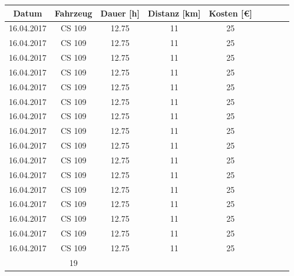 \documentclass[
	pagenumber=false, %
	parskip=half, %
	fromalign=right, %
	foldmarks=true, %
	addrfield=true %
	firstfoot=on %
    ]{scrlttr2}
\begin{document}
\newpage
\begin{tabular}{ | c | c | c | c | c | c | c | c | c | }
\hline
Datum & Fahrzeug & Dauer [h] & Distanz [km]& Kosten [\euro{}]\\ \hline
16.04.2017 & CS 109 & 12.75 & 11 & 25 \\ 
16.04.2017 & CS 109 & 12.75 & 11 & 25 \\ 
16.04.2017 & CS 109 & 12.75 & 11 & 25 \\ 
16.04.2017 & CS 109 & 12.75 & 11 & 25 \\ 
16.04.2017 & CS 109 & 12.75 & 11 & 25 \\ 
16.04.2017 & CS 109 & 12.75 & 11 & 25 \\ 
16.04.2017 & CS 109 & 12.75 & 11 & 25 \\ 
16.04.2017 & CS 109 & 12.75 & 11 & 25 \\ 
16.04.2017 & CS 109 & 12.75 & 11 & 25 \\ 
16.04.2017 & CS 109 & 12.75 & 11 & 25 \\ 
16.04.2017 & CS 109 & 12.75 & 11 & 25 \\ 
16.04.2017 & CS 109 & 12.75 & 11 & 25 \\ 
16.04.2017 & CS 109 & 12.75 & 11 & 25 \\ 
16.04.2017 & CS 109 & 12.75 & 11 & 25 \\ 
16.04.2017 & CS 109 & 12.75 & 11 & 25 \\ 
16.04.2017 & CS 109 & 12.75 & 11 & 25 \\ 
\hhline{|-|-|-|-|=|}
\multicolumn{4}{|r|}{Summe:} &19\\\hline
\end{tabular}
\end{document}
